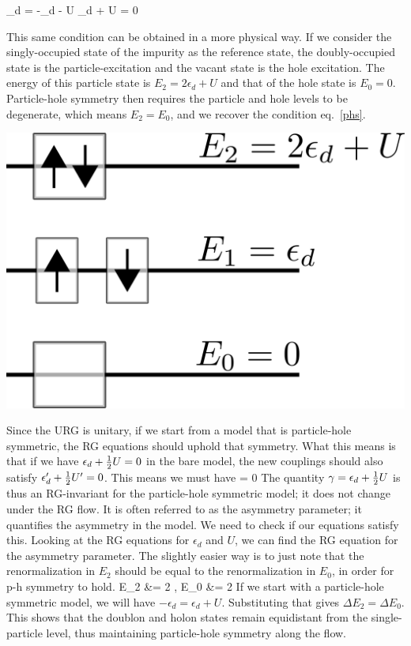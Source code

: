 \documentclass[12pt,twoside]{article}
\numberwithin{equation}{section}
\begin{document}
\beq[phs]
\epsilon_d = -\epsilon_d - U \implies \epsilon_d + \hf U = 0
\eeq
\begin{minipage}{260pt}
    This same condition can be obtained in a more physical way. If we consider the singly-occupied state of the impurity as the reference state, the doubly-occupied state is the particle-excitation and the vacant state is the hole excitation. The energy of this particle state is \(E_2 = 2\epsilon_d + U\) and that of the hole state is \(E_0 = 0\). Particle-hole symmetry then requires the particle and hole levels to be degenerate, which means \(E_2 = E_0\), and we recover the condition eq.~\ref{phs}.
\end{minipage}
\hspace*{15pt}\begin{minipage}{200pt}
    \centering\includegraphics[scale=0.3]{phsymm.png}
\end{minipage}
\pb Since the URG is unitary, if we start from a model that is particle-hole symmetric, the RG equations should uphold that symmetry. What this means is that if we have \(\epsilon_d + \frac{1}{2} U = 0\) in the bare model, the new couplings should also satisfy \(\epsilon_d^\prime + \frac{1}{2} U^\prime = 0\). This means we must have 
\beq
\Delta{} = 0
\eeq
The quantity \(\gamma = \epsilon_d + \frac{1}{2} U\) is thus an RG-invariant for the particle-hole symmetric model; it does not change under the RG flow. It is often referred to as the asymmetry parameter; it quantifies the asymmetry in the model. We need to check if our equations satisfy this. Looking at the RG equations for \(\epsilon_d\) and \(U\), we can find the RG equation for the asymmetry parameter. The slightly easier way is to just note that the renormalization in \(E_2\) should be equal to the renormalization in \(E_0\), in order for p-h symmetry to hold.
\beq
\Delta E_2 &= 2 \frac{\Delta}{\pi}, \Delta E_0 &= 2 \frac{\Delta}{\pi}
\eeq
If we start with a particle-hole symmetric model, we will have \(-\epsilon_d = \epsilon_d + U\). Substituting that gives \(\Delta E_2= \Delta E_0\). This shows that the doublon and holon states remain equidistant from the single-particle level, thus maintaining particle-hole symmetry along the flow.
\end{document}
